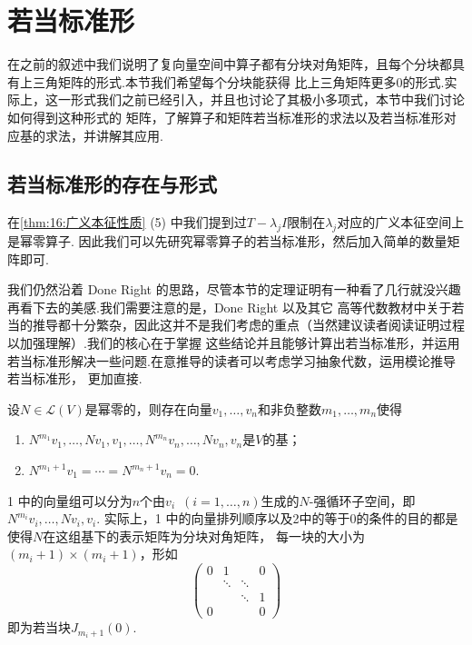 \chapter{若当标准形}
在之前的叙述中我们说明了复向量空间中算子都有分块对角矩阵，且每个分块都具有上三角矩阵的形式.本节我们希望每个分块能获得
比上三角矩阵更多0的形式.实际上，这一形式我们之前已经引入，并且也讨论了其极小多项式，本节中我们讨论如何得到这种形式的
矩阵，了解算子和矩阵若当标准形的求法以及若当标准形对应基的求法，并讲解其应用.

\section{若当标准形的存在与形式}
在\autoref{thm:16:广义本征性质} (5) 中我们提到过$T-\lambda_jI$限制在$\lambda_j$对应的广义本征空间上是幂零算子.
因此我们可以先研究幂零算子的若当标准形，然后加入简单的数量矩阵即可.

我们仍然沿着 Done Right 的思路，尽管本节的定理证明有一种看了几行就没兴趣再看下去的美感.我们需要注意的是，Done Right 以及其它
高等代数教材中关于若当的推导都十分繁杂，因此这并不是我们考虑的重点（当然建议读者阅读证明过程以加强理解）.我们的核心在于掌握
这些结论并且能够计算出若当标准形，并运用若当标准形解决一些问题.在意推导的读者可以考虑学习抽象代数，运用模论推导若当标准形，
更加直接.
\begin{theorem} \label{thm:18:若当基存在}
    设$N\in \mathcal{L}(V)$是幂零的，则存在向量$v_1,\ldots,v_n$和非负整数$m_1,\ldots,m_n$使得
    \begin{enumerate}
        \item $N^{m_1}v_1,\ldots,Nv_1,v_1,\ldots,N^{m_n}v_n,\ldots,Nv_n,v_n$是$V$的基；

        \item $N^{m_1+1}v_1=\cdots=N^{m_n+1}v_n=0$.
    \end{enumerate}
\end{theorem}
1 中的向量组可以分为$n$个由$v_i\enspace(i=1,\ldots,n)$生成的$N$-强循环子空间，即$N^{m_i}v_i,\ldots,Nv_i,v_i$.
实际上，1 中的向量排列顺序以及2中的等于0的条件的目的都是使得$N$在这组基下的表示矩阵为分块对角矩阵，
每一块的大小为$(m_i+1)\times(m_i+1)$，形如\[\begin{pmatrix}
    0 & 1 &  & 0 \\  & \ddots & \ddots &  \\  &  &  \ddots & 1 \\ 0 &  &  & 0
\end{pmatrix}\]即为若当块$J_{m_i+1}(0)$.

